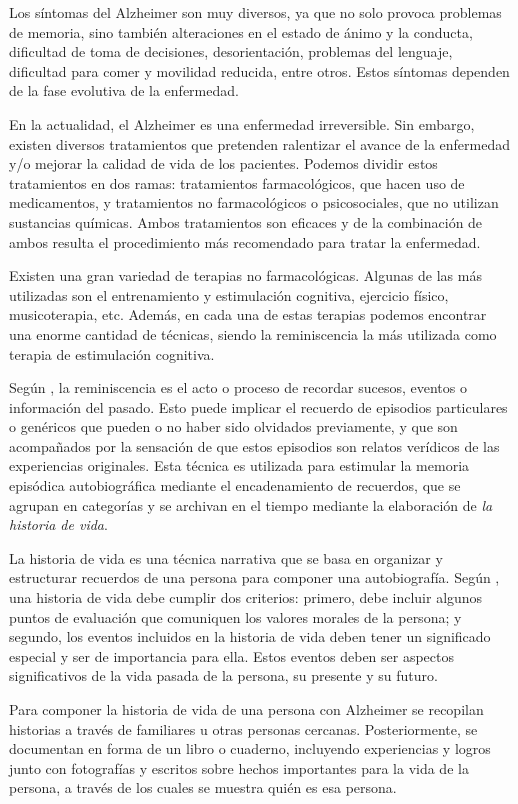 Los síntomas del Alzheimer son muy diversos, ya que no solo provoca problemas de memoria, sino también alteraciones en el estado de ánimo y la conducta, dificultad de toma de decisiones, desorientación, problemas del lenguaje, dificultad para comer y movilidad reducida, entre otros. Estos síntomas dependen de la fase evolutiva de la enfermedad.

En la actualidad, el Alzheimer es una enfermedad irreversible. Sin embargo, existen diversos tratamientos que pretenden ralentizar el avance de la enfermedad y/o mejorar la calidad de vida de los pacientes. Podemos dividir estos tratamientos en dos ramas: tratamientos farmacológicos, que hacen uso de medicamentos, y tratamientos no farmacológicos o psicosociales, que no utilizan sustancias químicas. Ambos tratamientos son eficaces y de la combinación de ambos resulta el procedimiento más recomendado para tratar la enfermedad.\citep{romano2007enfermedad}

Existen una gran variedad de terapias no farmacológicas. Algunas de las más utilizadas son el entrenamiento y estimulación cognitiva, ejercicio físico, musicoterapia, etc. Además, en cada una de estas terapias podemos encontrar una enorme cantidad de técnicas, siendo la reminiscencia la más utilizada como terapia de estimulación cognitiva.

Según \cite{o2013cross}, la reminiscencia es el acto o proceso de recordar sucesos, eventos o información del pasado. Esto puede implicar el recuerdo de episodios particulares o genéricos que pueden o no haber sido olvidados previamente, y que son acompañados por la sensación de que estos episodios son relatos verídicos de las experiencias originales. Esta técnica es utilizada para estimular la memoria episódica autobiográfica mediante el encadenamiento de recuerdos, que se agrupan en categorías y se archivan en el tiempo mediante la elaboración de \textit{la historia de vida}.

La historia de vida es una técnica narrativa que se basa en organizar y estructurar recuerdos de una persona para componer una autobiografía. Según \cite{linde1993life}, una historia de vida debe cumplir dos criterios: primero, debe incluir algunos puntos de evaluación que comuniquen los valores morales de la persona; y segundo, los eventos incluidos en la historia de vida deben tener un significado especial y ser de importancia para ella. Estos eventos deben ser aspectos significativos de la vida pasada de la persona, su presente y su futuro.

Para componer la historia de vida de una persona con Alzheimer se recopilan historias a través de familiares u otras personas cercanas. Posteriormente, se documentan en forma de un libro o cuaderno, incluyendo experiencias y logros junto con fotografías y escritos sobre hechos importantes para la vida de la persona, a través de los cuales se muestra quién es esa persona.


